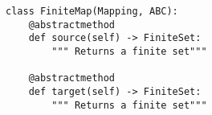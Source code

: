 \par\begin{minipage}{60ex}
\begin{verbatim}
class FiniteMap(Mapping, ABC):
    @abstractmethod
    def source(self) -> FiniteSet:
        """ Returns a finite set"""

    @abstractmethod
    def target(self) -> FiniteSet:
        """ Returns a finite set"""
\end{verbatim}
\end{minipage}\par